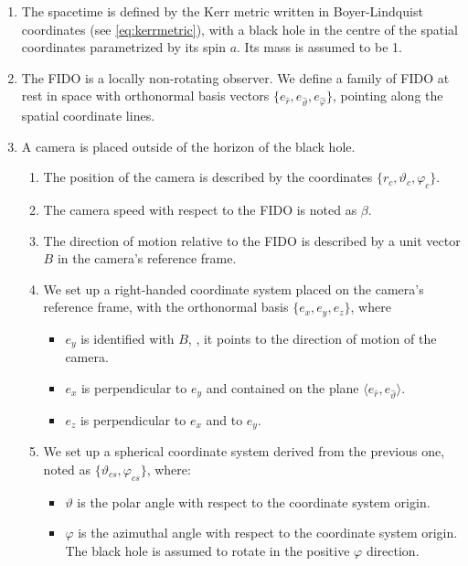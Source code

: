 \begin{enumerate}
	\item The spacetime is defined by the Kerr metric written in Boyer-Lindquist coordinates (see \autoref{eq:kerrmetric}), with a black hole in the centre of the spatial coordinates parametrized by its spin $a$. Its mass is assumed to be 1.
	\item The \ac{FIDO} is a locally non-rotating observer. We define a family of \ac{FIDO} at rest in space with orthonormal basis vectors $\{e_{\widehat{r}}, e_{\widehat{\vartheta}}, e_{\widehat{\varphi}}\}$, pointing along the spatial coordinate lines.
	\item A camera is placed outside of the horizon of the black hole.
	\begin{enumerate}
		\item The position of the camera is described by the coordinates $\{r_c, \vartheta_c, \varphi_c\}$.
		\item The camera speed with respect to the \ac{FIDO} is noted as $\beta$.
		\item The direction of motion relative to the \ac{FIDO} is described by a unit vector $B$ in the camera's reference frame.
		\item We set up a right-handed coordinate system placed on the camera's reference frame, with the orthonormal basis $\{e_x, e_y, e_z\}$, where
		\begin{itemize}
			\item $e_y$ is identified with $B$, \ie, it points to the direction of motion of the camera.
			\item $e_x$ is perpendicular to $e_y$ and contained on the plane $\langle e_{\widehat{r}}, e_{\widehat{\vartheta}} \rangle$.
			\item $e_z$ is perpendicular to $e_x$ and to $e_y$.
		\end{itemize}
		\item We set up a spherical coordinate system derived from the previous one, noted as $\{\vartheta_{cs}, \varphi_{cs}\}$, where:
		\begin{itemize}
			\item $\vartheta$ is the polar angle with respect to the coordinate system origin.
			\item $\varphi$ is the azimuthal angle with respect to the coordinate system origin. The black hole is assumed to rotate in the positive $\varphi$ direction.
		\end{itemize}
	\end{enumerate}
\end{enumerate}

